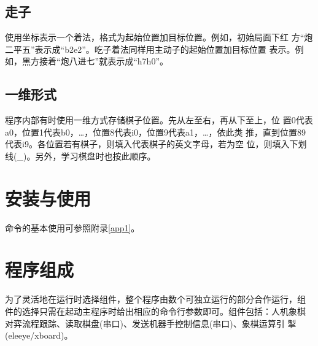 \documentclass[a4paper]{article}
\begin{document}
\subsection{走子}
使用坐标表示一个着法，格式为起始位置加目标位置。例如，初始局面下红
方``炮二平五''表示成``b2e2''。吃子着法同样用主动子的起始位置加目标位置
表示。例如，黑方接着``炮八进七''就表示成``h7h0''。

\smallboard
\begin{position}
   
   
   
   
   
      

   
   
   
   
   
      
\end{position}
\smallboard
\begin{position}
   
   
   
   
   
      

   
   
   
   
      
\end{position}

\subsection{一维形式}
程序内部有时使用一维方式存储棋子位置。先从左至右，再从下至上，位
置0代表a0，位置1代表b0，\dots，位置8代表i0，位置9代表a1，\dots，依此类
推，直到位置89代表i9。各位置若有棋子，则填入代表棋子的英文字母，若为空
位，则填入下划线(\_)。另外，学习棋盘时也按此顺序。

\section{安装与使用}
命令的基本使用可参照附录\ref{app1}。

\section{程序组成}
为了灵活地在运行时选择组件，整个程序由数个可独立运行的部分合作运行，组
件的选择只需在起动主程序时给出相应的命令行参数即可。组件包括：人机象棋
对弈流程跟踪、读取棋盘(串口)、发送机器手控制信息(串口)、象棋运算引
掣(eleeye/xboard)。
\end{document}
